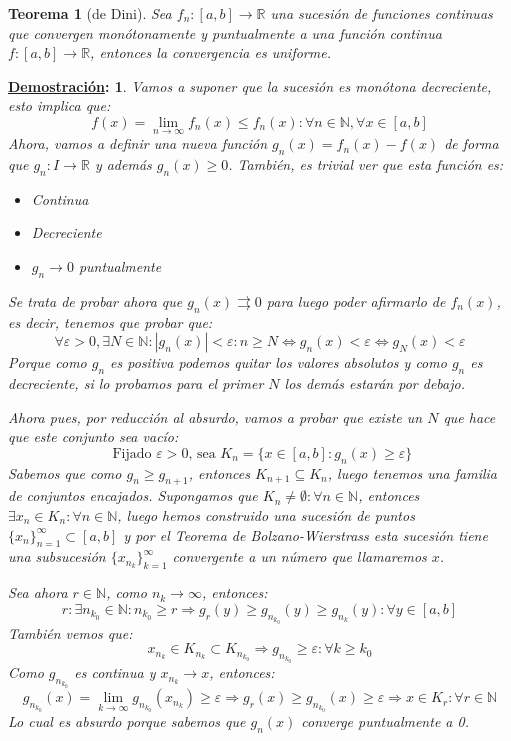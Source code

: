 \documentclass[10pt,a4paper,openright]{book}
\theoremstyle{break}
\newtheorem*{theo}{Teorema}
\newtheorem*{demo}{\underline{Demostración}:}
\begin{document}
\begin{theo}[de Dini]
Sea $f_n  : [a,b] \to \mathbb{R}$ una sucesión de funciones continuas que convergen monótonamente y puntualmente a una función continua $f: [a,b] \to \mathbb{R}$, entonces la convergencia es uniforme.
\end{theo}
\begin{demo}
Vamos a suponer que la sucesión es monótona decreciente, esto implica que:
$$f(x) = \lim_{n \to \infty} f_n (x) \leq f_n (x) : \forall n \in \mathbb N, \forall x \in [a,b]$$
Ahora, vamos a definir una nueva función $g_n(x) = f_n(x)-f(x)$ de forma que $g_n : I \rightarrow \mathbb R$ y además $g_n(x) \geq 0$. También, es trivial ver que esta función es:
\begin{itemize}
\item Continua
\item Decreciente
\item $g_n \rightarrow 0$ puntualmente
\end{itemize}
Se trata de probar ahora que $g_n(x)\rightrightarrows 0$ para luego poder afirmarlo de $f_n(x)$, es decir, tenemos que probar que:
$$ \forall \varepsilon > 0, \exists N \in \mathbb{N} : |g_n (x)| < \varepsilon : n \geq N \Leftrightarrow g_n(x) < \varepsilon \Leftrightarrow g_N(x)< \varepsilon$$
Porque como $g_n$ es positiva podemos quitar los valores absolutos y como $g_n$ es decreciente, si lo probamos para el primer $N$ los demás estarán por debajo.

Ahora pues, por reducción al absurdo, vamos a probar que existe un $N$ que hace que este conjunto sea vacío:
$$ \mbox{ Fijado $\varepsilon >0$, sea }K_n = \{ x \in [a,b] : g_n (x) \geq \varepsilon\}$$
Sabemos que como $g_n \geq g_{n+1}$, entonces $K_{n+1} \subseteq K_n$, luego tenemos una familia de conjuntos encajados. Supongamos que $K_n \neq \emptyset: \forall n \in \mathbb N$, entonces $\exists x_n \in K_n: \forall n \in \mathbb N$, luego hemos construido una sucesión de puntos $\{x_n\}_{n=1}^\infty \subset [a,b]$ y por el Teorema de Bolzano-Wierstrass esta sucesión tiene una subsucesión $\{x_{n_k}\}_{k=1}^\infty$ convergente a un número que llamaremos $x$.

Sea ahora $r\in \mathbb N$, como $n_k \rightarrow \infty$, entonces:
$$r: \exists n_{k_0}\in \mathbb N: n_{k_0} \geq r \Rightarrow g_r(y)\geq g_{n_{k_0}}(y) \geq g_{n_k}(y) : \forall y \in [a,b]$$
También vemos que:
$$x_{n_k}\in K_{n_k} \subset K_{n_{k_0}} \Rightarrow g_{n_{k_0}}\geq \varepsilon : \forall k \geq k_0$$
Como $g_{n_{k_0}}$ es continua y $x_{n_k}\rightarrow x$, entonces:
$$g_{n_{k_0}} (x) = \lim_{k \to \infty} g_{n_{k_0}} (x_{n_k}) \geq \varepsilon \Rightarrow g_r (x) \geq g_{n_{k_0}} (x) \geq \varepsilon \Rightarrow x \in K_r : \forall r \in \mathbb{N}$$
Lo cual es absurdo porque sabemos que $g_n(x)$ converge puntualmente a 0.
\end{demo}
\end{document}
